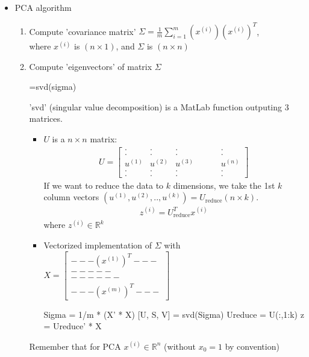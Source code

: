 \documentclass[a4paper,12pt]{report}
\begin{document}
\begin{itemize}
\item PCA algorithm
\begin{enumerate}
\item Compute 'covariance matrix' $\Sigma = \frac{1}{m} \sum_{i=1} ^m (x^{(i)})(x^{(i)})^T $,\\
where $x^{(i)}$ is $(n \times 1)$, and $\Sigma$ is $(n \times n)$\\
\item Compute 'eigenvectors' of matrix $\Sigma$

\begin{tcolorbox}
\begin{python}
[U, S, V] =svd(sigma)
\end{python}
\end{tcolorbox}
'svd' (singular value decomposition) is a MatLab function outputing 3 matrices. \\
\begin{itemize}
\item $U$ is a $n\times n$ matrix:
\begin{align}
U = \left[ \begin{smallmatrix} . & . & . & & & & . \\ . & . & . & & & & . \\ u^{(1)} & u^{(2)} & u^{(3)} & & & & u^{(n)}   \\ . & . & . & & & & . \\ . & . & . & & & & . \end{smallmatrix} \right]
\end{align}
If we want to reduce the data to $k$ dimensions, we take the 1st $k$ column vectors $(u^{(1)}, u^{(2)}, .., u^{(k)}) = U_{\text{reduce}} (n \times k)$.
\begin{align}
z^{(i)} = U_{\text{reduce}} ^T x^{(i)}
\end{align}
where $z^{(i)} \in \mathbb{R}^k$

\item Vectorized implementation of $\Sigma$ with $X = \left[ \begin{smallmatrix} --- (x^{(1)})^T ---\\-----\\ ------\\--- (x^{(m)})^T ---  \end{smallmatrix} \right]$
\begin{tcolorbox}
\begin{python}
Sigma = 1/m * (X' * X)
[U, S, V] = svd(Sigma)
Ureduce = U(:,1:k)
z = Ureduce' * X
\end{python}
\end{tcolorbox}
\end{itemize}
Remember that for PCA $x^{(i)} \in \mathbb{R}^n $ (without $x_0=1$ by convention)
\end{enumerate}
\end{itemize}
\end{document}
